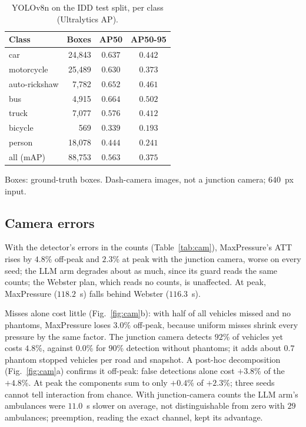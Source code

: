 \documentclass[conference]{IEEEtran}
\newcommand{\V}[2]{\ensuremath{#2}}
\begin{document}
\begin{table}[t]
\caption{YOLOv8n on the IDD test split, per class (Ultralytics AP).}
\label{tab:det}
\centering
\footnotesize
\begin{tabular}{@{}lrcc@{}}
\toprule
Class & Boxes & AP50 & AP50-95 \\
\midrule
car & 24,843 & $0.637$ & $0.442$ \\
motorcycle & 25,489 & $0.630$ & $0.373$ \\
auto-rickshaw & 7,782 & $0.652$ & $0.461$ \\
bus & 4,915 & $0.664$ & $0.502$ \\
truck & 7,077 & $0.576$ & $0.412$ \\
bicycle & 569 & $0.339$ & $0.193$ \\
person & 18,078 & $0.444$ & $0.241$ \\
\midrule
all (mAP) & 88,753 & $\mathbf{0.563}$ & $\mathbf{0.375}$ \\
\bottomrule
\end{tabular}
\par\vspace{2pt}
\parbox{\columnwidth}{\scriptsize Boxes: ground-truth boxes. Dash-camera images, not a
junction camera; \V{cfg.imgsz}{640}~px input.}
\end{table}

\subsection{Camera errors}\label{sec:res-cam}
With the detector's errors in the counts (Table~\ref{tab:cam}), MaxPressure's ATT rises by
\V{c.off.mp.junction.pct}{4.8}\% off-peak and \V{c.peak.mp.junction.pct}{2.3}\% at peak with
the junction camera, worse on every seed; the LLM arm degrades about as much, since its guard
reads the same counts; the Webster plan, which reads no counts, is unaffected. At peak,
MaxPressure (\V{c.peak.mp.junction.att}{118.2}~s) falls behind Webster
(\V{c.peak.web.junction.att}{116.3}~s).

Misses alone cost little (Fig.~\ref{fig:cam}b): with half of all vehicles missed and no
phantoms, MaxPressure loses \V{c.sweep.off.p50.pct}{3.0}\% off-peak, because uniform misses
shrink every pressure by the same factor. The junction camera detects
\V{c.peff.off.junction.pct}{92}\% of vehicles yet costs \V{c.off.mp.junction.pct}{4.8}\%,
against \V{c.sweep.off.p90.pct}{0.0}\% for \V{c.sweep.off.p90.level_pct}{90}\% detection
without phantoms; it adds about \V{c.phantoms_per_road}{0.7} phantom stopped vehicles per road
and snapshot. A post-hoc decomposition (Fig.~\ref{fig:cam}a) confirms it off-peak: false
detections alone cost \V{c.dec.false.off.pct}{+3.8}\% of the \V{c.dec.all.off.pct}{+4.8}\%.
At peak the components sum to only \V{c.dec.sum.peak.pct}{+0.4}\% of
\V{c.dec.all.peak.pct}{+2.3}\%; three seeds cannot tell interaction from chance. With
junction-camera counts the LLM arm's ambulances were \V{c.amb.llm.junction.amb_d}{11.0}~s slower
on average, not distinguishable from zero with \V{e.mp.amb_n}{29} ambulances; preemption,
reading the exact channel, kept its advantage.
\end{document}
